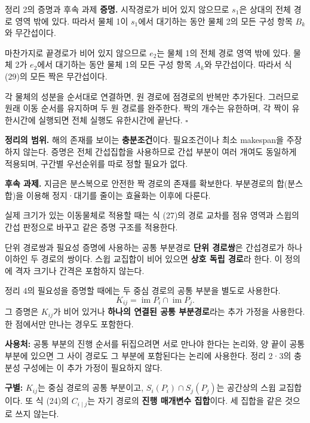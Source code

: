 \begin{frame}{정리 2의 증명과 후속 과제}
\small
\textbf{증명.} 시작경로가 비어 있지 않으므로 $s_1$은 상대의 전체 경로 영역 밖에 있다.
따라서 물체 1이 $s_1$에서 대기하는 동안 물체 2의 모든 구성 항목 $B_k$와 무간섭이다.
\par\medskip
마찬가지로 끝경로가 비어 있지 않으므로 $e_2$는 물체 1의 전체 경로 영역 밖에 있다.
물체 2가 $e_2$에서 대기하는 동안 물체 1의 모든 구성 항목 $A_k$와 무간섭이다.
따라서 식 (29)의 모든 짝은 무간섭이다.
\par\medskip
각 물체의 성분을 순서대로 연결하면, 원 경로에 점경로의 반복만 추가된다.
그러므로 원래 이동 순서를 유지하며 두 원 경로를 완주한다.
짝의 개수는 유한하며, 각 짝이 유한시간에 실행되면 전체 실행도 유한시간에 끝난다.
\hfill$\square$
\par\medskip
\textbf{정리의 범위.} 해의 존재를 보이는 \textbf{충분조건}이다.
필요조건이나 최소 makespan을 주장하지 않는다. 증명은 전체 간섭집합을 사용하므로
간섭 부분이 여러 개여도 동일하게 적용되며, 구간별 우선순위를 따로 정할 필요가 없다.
\par\medskip
\textbf{후속 과제.} 지금은 분스복으로 안전한 짝 경로의 존재를 확보한다.
부분경로의 합(분스합)을 이용해 정지·대기를 줄이는 효율화는 이후에 다룬다.
\par\smallskip\footnotesize
실제 크기가 있는 이동물체로 적용할 때는 식 (27)의 경로 교차를 점유 영역과
스윕의 간섭 판정으로 바꾸고 같은 증명 구조를 적용한다.
\end{frame}

\begin{frame}{단위 경로쌍과 필요성 증명에 사용하는 공통 부분경로}
\small
\textbf{단위 경로쌍}은 간섭경로가 하나 이하인 두 경로의 쌍이다.
스윕 교집합이 비어 있으면 \textbf{상호 독립 경로}라 한다.
이 정의에 격자 크기나 간격은 포함하지 않는다.
\par\medskip
정리 4의 필요성을 증명할 때에는 두 중심 경로의 공통 부분을 별도로 사용한다.
\begin{equation}
 K_{ij}=\operatorname{im}P_i\cap\operatorname{im}P_j.
 \tag{35}
\end{equation}
그 증명은 $K_{ij}$가 비어 있거나 \textbf{하나의 연결된 공통 부분경로}라는
추가 가정을 사용한다. 한 점에서만 만나는 경우도 포함한다.
\begin{center}\end{center}
\textbf{사용처:} 공통 부분의 진행 순서를 뒤집으려면 서로 만나야 한다는 논리와,
양 끝이 공통 부분에 있으면 그 사이 경로도 그 부분에 포함된다는 논리에 사용한다.
정리 2·3의 충분성 구성에는 이 추가 가정이 필요하지 않다.
\par\medskip
\textbf{구별:} $K_{ij}$는 중심 경로의 공통 부분이고,
$S_i(P_i)\cap S_j(P_j)$는 공간상의 스윕 교집합이다.
또 식 (24)의 $C_{i\mid j}$는 자기 경로의 \textbf{진행 매개변수 집합}이다.
세 집합을 같은 것으로 쓰지 않는다.
\end{frame}

